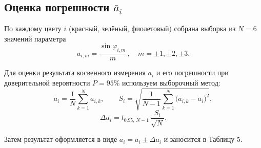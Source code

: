 \subsection{Оценка погрешности \(\bar a_i\)}

По каждому цвету \(i\) (красный, зелёный, фиолетовый) собрана выборка из \(N=6\) значений параметра
\[
	a_{i,m} = \frac{\sin\varphi_{i,m}}{m}\,, \quad m=\pm1,\pm2,\pm3.
\]

Для оценки результата косвенного измерения \(a_i\) и его погрешности при доверительной
вероятности \(P=95\%\) используем выборочный метод:
\[
	\bar a_i = \frac{1}{N}\sum_{k=1}^N a_{i,k},
	\qquad
	S_i = \sqrt{\frac{1}{N-1}\sum_{k=1}^N\bigl(a_{i,k}-\bar a_i\bigr)^2},
\]
\[
	\Delta\bar a_i = t_{0.95,\,N-1}\,\frac{S_i}{\sqrt{N}}.
\]

Затем результат оформляется в виде
\(\displaystyle a_i = \bar a_i \pm \Delta\bar a_i\)
и заносится в Таблицу 5.
